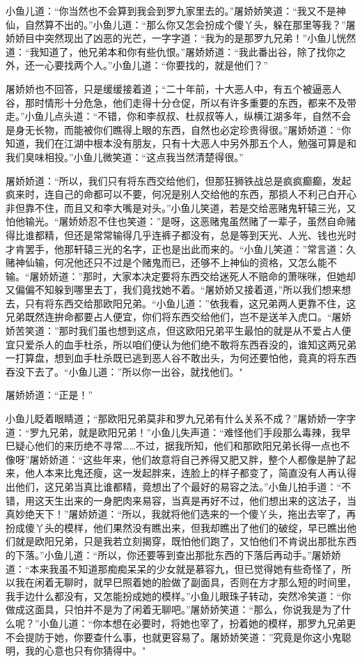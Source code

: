 \documentclass[12pt,oneside]{book}
\begin{document}
小鱼儿道：``你当然也不会算到我会到罗九家里去的。''屠娇娇笑道：``我又不是神仙，自然算不出的。''小鱼儿道：``那么你又怎会扮成个傻丫头，躲在那里等我？''屠娇娇目中突然现出了凶恶的光芒，一字字道：``我为的是那罗九兄弟！''小鱼儿恍然道：``我知道了，他兄弟本和你有些仇恨。''屠娇娇道：``我此番出谷，除了找你之外，还一心要找两个人。''小鱼儿道：``你要找的，就是他们？''

屠娇娇也不回答，只是缓缓接着道；``二十年前，十大恶人中，有五个被逼恶人谷，那时情形十分危急，他们走得十分仓促，所以有许多重要的东西，都来不及带走。''小鱼儿点头道：``不错，你和李叔叔、杜叔叔等人，纵横江湖多年，自然不会是身无长物，而能被你们瞧得上眼的东西，自然也必定珍贵得很。''屠娇娇道：``你知道，我们在江湖中根本没有朋友，只有十大恶人中另外那五个人，勉强可算是和我们臭味相投。''小鱼儿微笑道：``这点我当然清楚得很。''

屠娇娇道：``所以，我们只有将东西交给他们，但那狂狮铁战总是疯疯癫癫，发起疯来时，连自己的命都可以不要，何况是别人交给他的东西，那损人不利己白开心非但靠不住，而且又和李大嘴是对头。''小鱼儿笑道，若是交给恶赌鬼轩辕三光，又怕他输光。``屠娇娇忍不住也笑道：''是呀，这恶赌鬼虽然赌了一辈子，虽然自命赌得比谁都精，但还是常常输得几乎连裤子都没有，总是等到天光、人光、钱也光时才肯罢手，他那轩辕三光的名字，正也是出此而来的。``小鱼儿笑道：''常言道：久赌神仙输，何况他还只不过是个赌鬼而已，还够不上神仙的资格，又怎么能不输。``屠娇娇道：''那时，大家本决定要将东西交给迷死人不赔命的萧咪咪，但她却又偏偏不知躲到哪里去丁，我们竟找她不着。``屠娇娇又接着道，''所以我们想来想去，只有将东西交给那欧阳兄弟。``小鱼儿道：''依我看，这兄弟两人更靠不住，这兄弟既然连拚命都要占人便宜，你们将东西交给他们，岂不是送羊入虎口。``屠娇娇苦笑道：''那时我们虽也想到这点，但这欧阳兄弟平生最怕的就是从不爱占人便宜只爱杀人的血手杜杀，所以咱们便认为他们绝不敢将东西吞没的，谁知这两兄弟一打算盘，想到血手杜杀既已逃到恶人谷不敢出头，为何还要怕他，竟真的将东西吞没下去了。``小鱼儿道：''所以你一出谷，就找他们。"

屠娇娇道：``正是！''

小鱼儿眨着眼睛道；``那欧阳兄弟莫非和罗九兄弟有什么关系不成？''屠娇娇一字字道：``罗九兄弟，就是欧阳兄弟！''小鱼儿失声道：``难怪他们手段那么毒辣，我早巳疑心他们的来历绝不寻常\ldots\ldots 不过，据我所知，他们和那欧阳兄弟长得一点也不像呀''屠娇娇道：``这些年来，他们故意将自己养得又肥又胖，整个人都像是肿了起来，他人本来比鬼还瘦，这一发起胖来，连脸上的样子都变了，简直没有人再认得出他们，这兄弟当真比谁都精，竟想出了个最好的易容之法。''小鱼儿拍手道：``不错，用这天生出来的一身肥肉来易容，当真是再好不过，他们想出来的这法子，当真妙绝天下！''屠娇娇道：``所以，我就将他们选来的一个傻丫头，拖出去宰了，再扮成傻丫头的模样，他们果然没有瞧出来，但我却瞧出了他们的破绽，早已瞧出他们就是欧阳兄弟，只是我若立刻揭穿，既怕他们跑了，又怕他们不肯说出那批东西的下落。''小鱼儿道：``所以，你还要等到查出那批东西的下落后再动手。''屠娇娇道：``本来我虽不知道那痴痴呆呆的少女就是慕容九，但已觉得她有些奇怪了，所以我在闲着无聊时，就早巳照着她的脸做了副面具，否则在方才那么短的时间里，我手边什么都没有，又怎能扮成她的模样。''小鱼儿眼珠子转动，突然冷笑道：``你做成这面具，只怕并不是为了闲着无聊吧。''屠娇娇笑道：``那么，你说我是为了什么呢？''小鱼儿道：``你本想在必要时，将她也宰了，扮着她的模样，那罗九兄弟更不会提防于她，你要查什么事，也就更容易了。屠娇娇笑道：''究竟是你这小鬼聪明，我的心意也只有你猜得中。"
\end{document}
